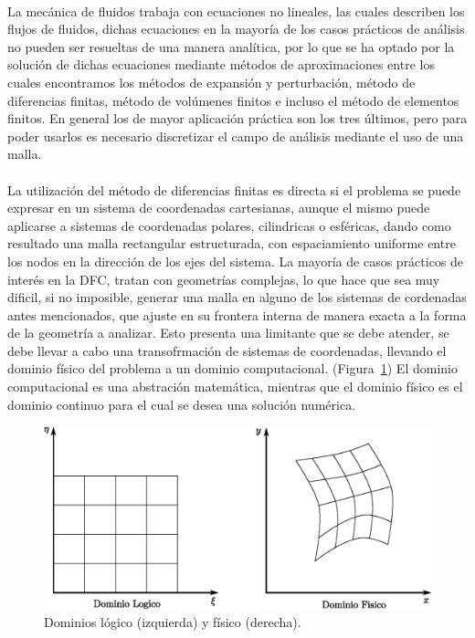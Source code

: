 \documentclass[letterpaper, openright, 12pt]{book}
\begin{document}
    \paragraph*{}
    La mecánica de fluidos trabaja con ecuaciones no lineales, las cuales
    describen los flujos de fluidos, dichas ecuaciones en la mayoría de los
    casos prácticos de análisis no pueden ser resueltas de una manera analítica,
    por lo que se ha optado por la solución de dichas ecuaciones mediante
    métodos de aproximaciones entre los cuales encontramos los métodos de
    expansión y perturbación, método de diferencias finitas, método de volúmenes
    finitos e incluso el método de elementos finitos. En general los de mayor
    aplicación práctica son los tres últimos, pero para poder usarlos es
    necesario discretizar el campo de análisis mediante el uso de una malla.\cite{thompsonhandbook}
    \paragraph*{}
    La utilización del método de diferencias finitas es directa si el problema
    se puede expresar en un sistema de coordenadas cartesianas, aunque el mismo
    puede aplicarse a sistemas de coordenadas polares, cilindricas o esféricas,
    dando como resultado una malla rectangular estructurada, con espaciamiento
    uniforme entre los nodos en la dirección de los ejes del sistema. La mayoría
    de casos prácticos de interés en la DFC, tratan con geometrías complejas,
    lo que hace que sea muy dificil, si no imposible, generar una malla en
    alguno de los sistemas de cordenadas antes mencionados, que ajuste en su
    frontera interna de manera exacta a la forma de la geometría a analizar.
    Esto presenta una limitante que se debe atender, se debe llevar a cabo una
    transofrmación de sistemas de coordenadas, llevando el dominio físico del
    problema a un dominio computacional. (Figura~\ref{fig:dominios}) El dominio
    computacional es una abstración matemática, mientras que el dominio físico
    es el dominio continuo para el cual se desea una solución numérica.
    \begin{figure}[htbp!]
        \centering
        \includegraphics[keepaspectratio, width=170mm]{./img/dominios}
        \caption[Dominios lógico y físico]{Dominios lógico (izquierda) y físico (derecha). \cite{numerical-grid}}
        \label{fig:dominios}
    \end{figure}
\end{document}

